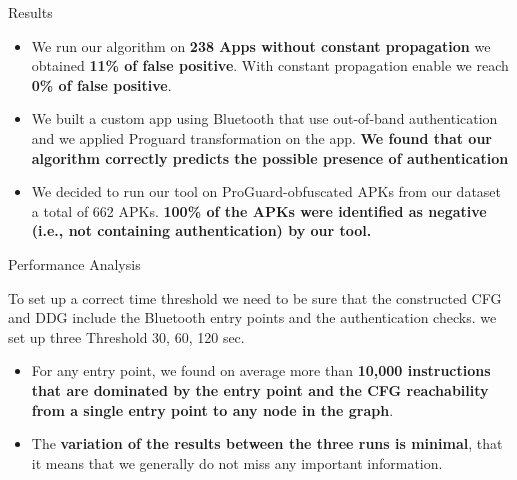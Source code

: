 \documentclass[10pt]{beamer}
\begin{document}
\begin{frame}[fragile]{Results}

\begin{itemize}

\item We run our algorithm on {\bf 238 Apps without constant
    propagation} we obtained {\bf 11\% of false positive}. With
  constant propagation enable we reach {\bf 0\% of false positive}.

\item We built a custom app using Bluetooth that use out-of-band
  authentication and we applied Proguard transformation on the
  app. {\bf We found that our algorithm correctly predicts the
    possible presence of authentication}

\item We decided to run our tool on ProGuard-obfuscated APKs from our
  dataset a total of 662 APKs. {\bf 100\% of the APKs were identified
    as negative (i.e., not containing authentication) by our tool.}
  

\end{itemize}

\end{frame}

\begin{frame}[fragile]{Performance Analysis}

  To set up a correct time threshold we need to be sure that the
  constructed CFG and DDG include the Bluetooth entry points and the
  authentication checks. we set up three Threshold 30, 60, 120 sec.
  
\begin{itemize}

\item For any entry point, we found on average more than {\bf 10,000
    instructions that are dominated by the entry point and the CFG
    reachability from a single entry point to any node in the graph}.
  
\item The {\bf variation of the results between the three runs is
    minimal}, that it means that we generally do not miss any
  important information.
  
  
\end{itemize}

\end{frame}
\end{document}
